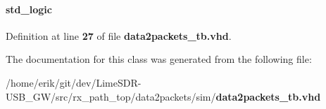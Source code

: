 \paragraph[{reset\+\_\+n}]{ {\bfseries \textcolor{comment}{std\+\_\+logic}\textcolor{vhdlchar}{ }} \hspace{0.3cm}{\ttfamily [Signal]}}\label{classdata2packets__tb_1_1tb__behave_a1f070fd63a3a7fa45c907335ea870c5b}


Definition at line {\bf 27} of file {\bf data2packets\+\_\+tb.\+vhd}.



The documentation for this class was generated from the following file\+:\begin{DoxyCompactItemize}
\item 
/home/erik/git/dev/\+Lime\+S\+D\+R-\/\+U\+S\+B\+\_\+\+G\+W/src/rx\+\_\+path\+\_\+top/data2packets/sim/{\bf data2packets\+\_\+tb.\+vhd}\end{DoxyCompactItemize}
